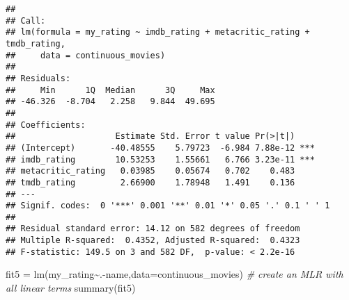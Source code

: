 \documentclass[
]{article}
\newenvironment{Shaded}{\begin{snugshade}}{\end{snugshade}}
\newcommand{\AttributeTok}[1]{\textcolor[rgb]{0.77,0.63,0.00}{#1}}
\newcommand{\CommentTok}[1]{\textcolor[rgb]{0.56,0.35,0.01}{\textit{#1}}}
\newcommand{\FunctionTok}[1]{\textcolor[rgb]{0.00,0.00,0.00}{#1}}
\newcommand{\NormalTok}[1]{#1}
\newcommand{\OtherTok}[1]{\textcolor[rgb]{0.56,0.35,0.01}{#1}}
\newcommand{\SpecialCharTok}[1]{\textcolor[rgb]{0.00,0.00,0.00}{#1}}
\begin{document}
\begin{verbatim}
## 
## Call:
## lm(formula = my_rating ~ imdb_rating + metacritic_rating + tmdb_rating, 
##     data = continuous_movies)
## 
## Residuals:
##     Min      1Q  Median      3Q     Max 
## -46.326  -8.704   2.258   9.844  49.695 
## 
## Coefficients:
##                    Estimate Std. Error t value Pr(>|t|)    
## (Intercept)       -40.48555    5.79723  -6.984 7.88e-12 ***
## imdb_rating        10.53253    1.55661   6.766 3.23e-11 ***
## metacritic_rating   0.03985    0.05674   0.702    0.483    
## tmdb_rating         2.66900    1.78948   1.491    0.136    
## ---
## Signif. codes:  0 '***' 0.001 '**' 0.01 '*' 0.05 '.' 0.1 ' ' 1
## 
## Residual standard error: 14.12 on 582 degrees of freedom
## Multiple R-squared:  0.4352, Adjusted R-squared:  0.4323 
## F-statistic: 149.5 on 3 and 582 DF,  p-value: < 2.2e-16
\end{verbatim}

\begin{Shaded}
\begin{Highlighting}[]
\NormalTok{fit5 }\OtherTok{=} \FunctionTok{lm}\NormalTok{(my\_rating}\SpecialCharTok{\textasciitilde{}}\NormalTok{.}\SpecialCharTok{{-}}\NormalTok{name,}\AttributeTok{data=}\NormalTok{continuous\_movies) }\CommentTok{\# create an MLR with all linear terms}
\FunctionTok{summary}\NormalTok{(fit5)}
\end{Highlighting}
\end{Shaded}
\end{document}
